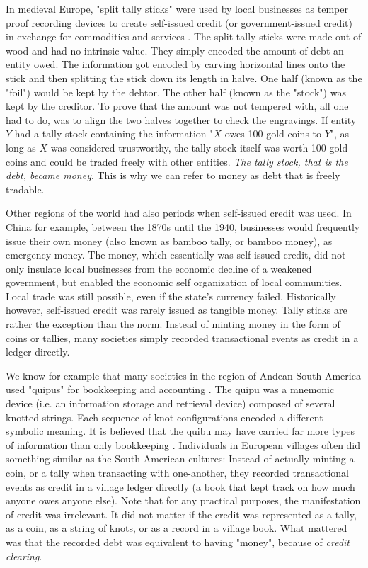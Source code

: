 \documentclass{article}
\begin{document}
In medieval Europe, "split tally sticks" were used by local businesses as temper proof recording devices to create self-issued credit (or government-issued credit) in exchange for commodities and services \cite{goetzmann_origins_2005}. The split tally sticks were made out of wood and had no intrinsic value. They simply encoded the amount of debt an entity owed. The information got encoded by carving horizontal lines onto the stick and then splitting the stick down its  length in halve. One half (known as the "foil") would be kept by the debtor. The other half (known as the "stock") was kept by the creditor. To prove that the amount was not tempered with, all one had to do, was to align the two halves together to check the engravings. If entity $Y$ had a tally stock containing the information "$X$ owes 100 gold coins to $Y$", as long as $X$ was considered trustworthy, the tally stock itself was worth 100 gold coins and could be traded freely with other entities. \textit{The tally stock, that is the debt, became money}. This is why we can refer to money as debt that is freely tradable.  

Other regions of the world had also periods when self-issued credit was used. In China for example, between the 1870s until the 1940, businesses would frequently issue their own money (also known as bamboo tally, or bamboo money), as emergency money. The money, which essentially was self-issued credit, did not only insulate local businesses from the economic decline of a weakened government, but enabled the economic self organization of local communities. Local trade was still possible, even if the state's currency failed. Historically however, self-issued credit was rarely issued as tangible money. Tally sticks are rather the exception than the norm. Instead of minting money in the form of coins or tallies, many societies simply recorded transactional events as credit in a ledger directly. 

We know for example that many societies in the region of Andean South America used "quipus" for bookkeeping and accounting \cite{benson_quipu_1975}. The quipu was a mnemonic device (i.e. an information storage and retrieval device) composed of several knotted strings. Each sequence of knot configurations encoded a different symbolic meaning. It is believed that the quibu may have carried far more types of information than only bookkeeping \cite{benson_quipu_1975}. Individuals in European villages often did something similar as the South American cultures: Instead of actually minting a coin, or a tally when transacting with one-another, they recorded transactional events as credit in a village ledger directly (a book that kept track on how much anyone owes anyone else). Note that for any practical purposes, the manifestation of credit was irrelevant. It did not matter if the credit was represented as a tally, as a coin, as a string of knots, or as a record in a village book. What mattered was that the recorded debt was equivalent to having "money", because of \textit{credit clearing}.
\end{document}
